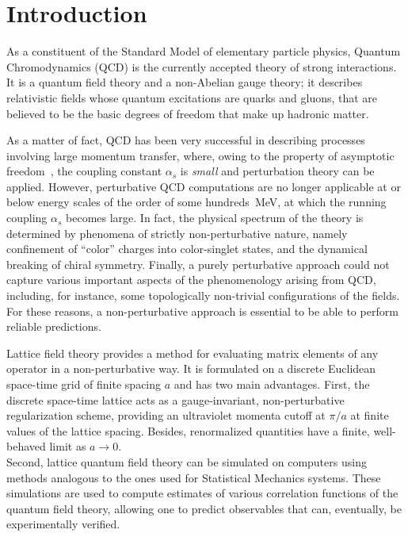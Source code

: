 \pagestyle{myFancy}
\chapter{Introduction}

As a constituent of the Standard Model of elementary particle physics, Quantum Chromodynamics (QCD) is the currently accepted theory of strong interactions. It is a quantum field theory and a non-Abelian gauge theory; it describes relativistic fields whose quantum excitations are quarks and gluons, that are believed to be the basic degrees of freedom that make up hadronic matter.

As a matter of fact, QCD has been very successful in describing processes involving large momentum transfer, where, owing to the property of asymptotic freedom~\cite{Gross:1973id, Politzer:1973fx}, the coupling constant $\alpha_s$ is \emph{small} and perturbation theory can be applied.
However, perturbative QCD computations are no longer applicable at or below energy scales of the order of some hundreds~MeV, at which the running coupling $\alpha_s$ becomes large. In fact, the physical spectrum of the theory is determined by phenomena of strictly non-perturbative nature, namely confinement of ``color'' charges into color-singlet states, and the dynamical breaking of chiral symmetry. Finally, a purely perturbative approach could not capture various important aspects of the phenomenology arising from QCD, including, for instance, some topologically non-trivial configurations of the fields. For these reasons, a non-perturbative approach is essential to be able to perform reliable predictions.

Lattice field theory provides a method for evaluating matrix elements of any operator in a non-perturbative way.
It is formulated on a discrete Euclidean space-time grid of finite spacing $a$ and has two main advantages.
First, the discrete space-time lattice acts as a gauge-invariant, non-perturbative regularization scheme, providing an ultraviolet momenta cutoff at $\pi/a$ at finite values of the lattice spacing.
Besides, renormalized quantities have a finite, well-behaved limit as $a\to0$.\\
Second, lattice quantum field theory can be simulated on computers using methods analogous to the ones used for Statistical Mechanics systems.
These simulations are used to compute estimates of various correlation functions of the quantum field theory, allowing one to predict observables that can, eventually, be experimentally verified.

